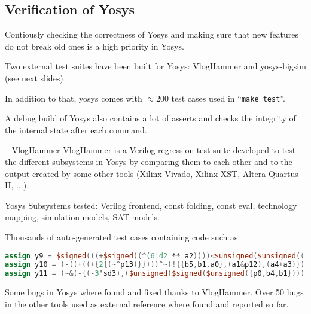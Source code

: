 
\subsection{Verification of Yosys}

\begin{frame}{\subsecname}
Contiously checking the correctness of Yosys and making sure that new features
do not break old ones is a high priority in Yosys.

\bigskip
Two external test suites have been built for Yosys: VlogHammer and yosys-bigsim
(see next slides)

\bigskip
In addition to that, yosys comes with $\approx\!200$ test cases used in ``{\tt make test}''.

\bigskip
A debug build of Yosys also contains a lot of asserts and checks the integrity of
the internal state after each command.
\end{frame}

\begin{frame}[fragile]{\subsecname{} -- VlogHammer}
VlogHammer is a Verilog regression test suite developed to test the different
subsystems in Yosys by comparing them to each other and to the output created
by some other tools (Xilinx Vivado, Xilinx XST, Altera Quartus II, ...).

\bigskip
Yosys Subsystems tested: Verilog frontend, const folding, const eval, technology mapping,
simulation models, SAT models.

\bigskip
Thousands of auto-generated test cases containing code such as:
\begin{lstlisting}[xleftmargin=1cm, basicstyle=\ttfamily\fontsize{8pt}{10pt}\selectfont, language=Verilog]
assign y9 = $signed(((+$signed((^(6'd2 ** a2))))<$unsigned($unsigned(((+a3))))));
assign y10 = (-((+((+{2{(~^p13)}})))^~(!{{b5,b1,a0},(a1&p12),(a4+a3)})));
assign y11 = (~&(-{(-3'sd3),($unsigned($signed($unsigned({p0,b4,b1}))))}));
\end{lstlisting}

\bigskip
Some bugs in Yosys where found and fixed thanks to VlogHammer. Over 50 bugs in
the other tools used as external reference where found and reported so far.
\end{frame}

